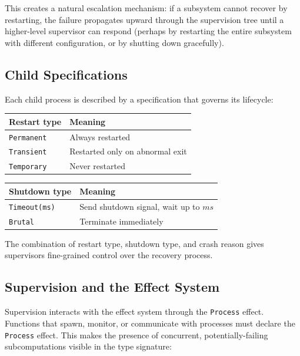 \documentclass[11pt,twocolumn]{article}
\begin{document}
This creates a natural escalation mechanism: if a subsystem cannot recover by restarting, the failure propagates upward through the supervision tree until a higher-level supervisor can respond (perhaps by restarting the entire subsystem with different configuration, or by shutting down gracefully).

\subsection{Child Specifications}

Each child process is described by a specification that governs its lifecycle:

\begin{center}
\begin{tabular}{@{}ll@{}}
\toprule
\textbf{Restart type} & \textbf{Meaning} \\
\midrule
\texttt{Permanent} & Always restarted \\
\texttt{Transient} & Restarted only on abnormal exit \\
\texttt{Temporary} & Never restarted \\
\bottomrule
\end{tabular}
\end{center}

\begin{center}
\begin{tabular}{@{}ll@{}}
\toprule
\textbf{Shutdown type} & \textbf{Meaning} \\
\midrule
\texttt{Timeout(ms)} & Send shutdown signal, wait up to $ms$ \\
\texttt{Brutal} & Terminate immediately \\
\bottomrule
\end{tabular}
\end{center}

The combination of restart type, shutdown type, and crash reason gives supervisors fine-grained control over the recovery process.

\subsection{Supervision and the Effect System}

Supervision interacts with the effect system through the \texttt{Process} effect. Functions that spawn, monitor, or communicate with processes must declare the \texttt{Process} effect. This makes the presence of concurrent, potentially-failing subcomputations visible in the type signature:
\end{document}
